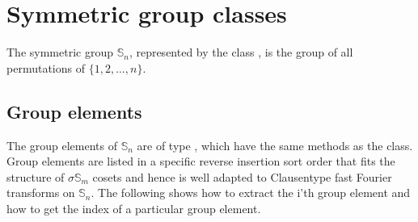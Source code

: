 \documentclass[letterpaper,10pt,english]{sphinxmanual}
\begin{document}
\begin{DUlineblock}{0em}
\item[] 
\end{DUlineblock}


\section{Symmetric group classes}
\label{\detokenize{index:symmetric-group-classes}}
\sphinxAtStartPar
The symmetric group \(\mathbb{S}_n\), represented by the class ,
is the group of all permutations of \(\{1,2,\ldots,n\}\).

\begin{sphinxVerbatim}[commandchars=\\\{\}]
   
    
\end{sphinxVerbatim}


\subsection{Group elements}
\label{\detokenize{index:group-elements}}
\sphinxAtStartPar
The group elements of \(\mathbb{S}_n\) are of type , which have the same methods as the
 class. Group elements are listed in a specific reverse insertion sort order that fits
the structure of \(\sigma\mathbb{S}_m\) cosets and hence is well adapted to Clausen\sphinxhyphen{}type
fast Fourier transforms on \(\mathbb{S}_n\). The following shows how to extract the i’th
group element and how to get the index of a particular group element.
\end{document}
